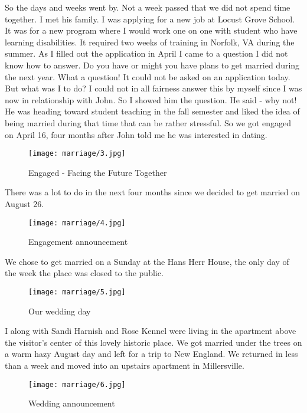 So the days and weeks went by.
Not a week passed that we did not spend time together.
I met his family.
I was applying for a new job at Locust Grove School.
It was for a new program where I would work one on one with student who have learning disabilities.
It required two weeks of training in Norfolk, VA during the summer.
As I filled out the application in April I came to a question I did not know how to answer.
Do you have or might you have plans to get married during the next year.
What a question! It could not be asked on an application today.
But what was I to do? I could not in all fairness answer this by myself since I was now in relationship with John.
So I showed him the question.
He said - why not! He was heading toward student teaching in the fall semester and liked the idea of being married during that time that can be rather stressful.
So we got engaged on April 16, four months after John told me he was interested in dating.
\begin{figure}
\centering
\texttt{[image: marriage/3.jpg]}
\caption{
Engaged - Facing the Future Together
}
\end{figure}
There was a lot to do in the next four months since we decided to get married on August 26.
\begin{figure}
\centering
\texttt{[image: marriage/4.jpg]}
\caption{
Engagement announcement
}
\end{figure}
We chose to get married on a Sunday at the Hans Herr House, the only day of the week the place was closed to the public.
\begin{figure}
\centering
\texttt{[image: marriage/5.jpg]}
\caption{
Our wedding day
}
\end{figure}
I along with Sandi Harnish and Rose Kennel were living in the apartment above the visitor's center of this lovely historic place.
We got married under the trees on a warm hazy August day and left for a trip to New England.
We returned in less than a week and moved into an upstairs apartment in Millersville.
\begin{figure}
\centering
\texttt{[image: marriage/6.jpg]}
\caption{
Wedding announcement
}
\end{figure}





